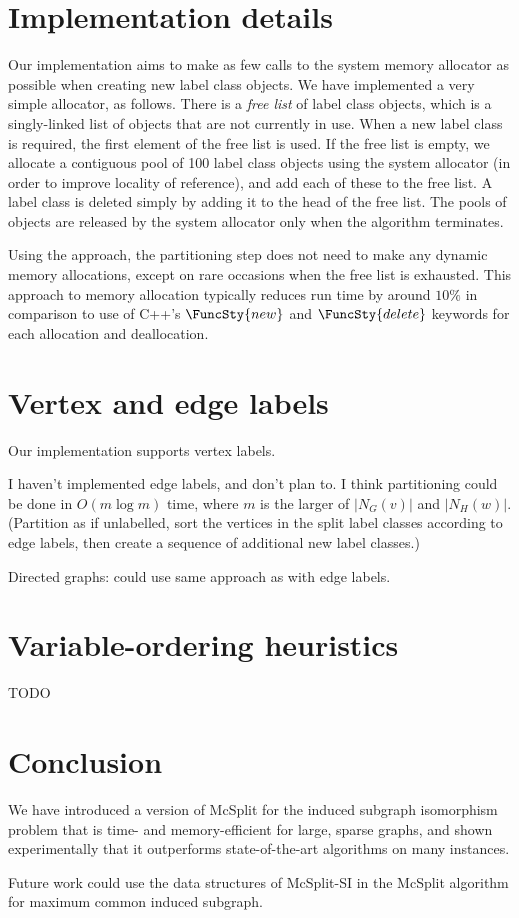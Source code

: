 \section{Implementation details}

Our implementation aims to make as few calls to the system memory allocator as possible when creating
new label class objects.  We have implemented a very simple allocator, as follows.  There is a \emph{free list}
of label class objects, which is a singly-linked list of objects that are not currently in use.  When
a new label class is required, the first element of the free list is used.  If the free list is empty,
we allocate a contiguous pool of 100 label class objects using the system allocator (in order to improve
locality of reference), and add each of these to the free list.  A label class is deleted simply by
adding it to the head of the free list.  The pools of objects are released by the system allocator only when
the algorithm terminates.

Using the approach, the partitioning step does not need to make any dynamic memory allocations, except
on rare occasions when the free list is exhausted.
This approach to memory allocation typically reduces run time by around $10\%$ in comparison to use of
C++'s $\FuncSty{new}$ and $\FuncSty{delete}$ keywords for each allocation and deallocation.

\section{Vertex and edge labels}

Our implementation supports vertex labels.

I haven't implemented edge labels, and don't plan to.
I think partitioning could be done in $O(m \log m)$ time, where
$m$ is the larger of $|N_G(v)|$ and $|N_H(w)|$. (Partition as if unlabelled, sort the vertices in
the split label classes according to edge labels, then create a sequence of additional new label classes.)

Directed graphs: could use same approach as with edge labels.

\section{Variable-ordering heuristics}

TODO

\section{Conclusion}

We have introduced a version of McSplit for the induced subgraph isomorphism problem that is time- and memory-efficient for large, sparse graphs, and shown experimentally that it outperforms state-of-the-art algorithms on many instances.

Future work could use the data structures of McSplit-SI in the McSplit algorithm for maximum common induced subgraph.
